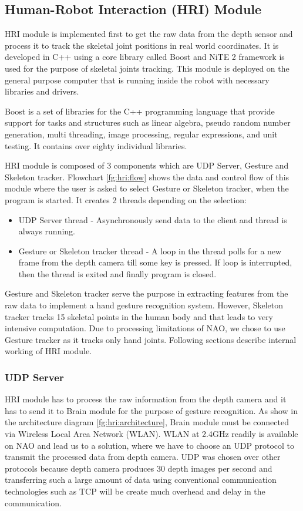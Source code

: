 \subsection{Human-Robot Interaction (HRI) Module} HRI module is implemented first to get the raw data from the depth sensor and process it to track the skeletal joint positions in real world coordinates. It is developed in C++ using a core library called Boost and NiTE 2 framework is used for the purpose of skeletal joints tracking. This module is deployed on the general purpose computer that is running inside the robot with necessary libraries and drivers.

Boost is a set of libraries for the C++ programming language that provide support for tasks and structures such as linear algebra, pseudo random number generation, multi threading, image processing, regular expressions, and unit testing. It contains over eighty individual libraries.

HRI module is composed of 3 components which are UDP Server, Gesture and Skeleton tracker. Flowchart \ref{fg:hri:flow} shows the data and control flow of this module where the user is asked to select Gesture or Skeleton tracker, when the program is started. It creates 2 threads depending on the selection: 
\begin{itemize}
	\item UDP Server thread - Asynchronously send data to the client and thread is always running. 
	\item Gesture or Skeleton tracker thread - A loop in the thread polls for a new frame from the depth camera till some key is pressed. If loop is interrupted, then the thread is exited and finally program is closed.
\end{itemize}

Gesture and Skeleton tracker serve the purpose in extracting features from the raw data to implement a hand gesture recognition system. However, Skeleton tracker tracks 15 skeletal points in the human body and that leads to very intensive computation. Due to processing limitations of NAO, we chose to use Gesture tracker as it tracks only hand joints. Following sections describe internal working of HRI module.



\subsubsection{UDP Server} HRI module has to process the raw information from the depth camera and it has to send it to Brain module for the purpose of gesture recognition. As show in the architecture diagram \ref{fg:hri:architecture}, Brain module must be connected via Wireless Local Area Network (WLAN). WLAN at 2.4GHz readily is available on NAO and lead us to a solution, where we have to choose an UDP protocol to transmit the processed data from depth camera. UDP was chosen over other protocols because depth camera produces 30 depth images per second and transferring such a large amount of data using conventional communication technologies such as TCP will be create much overhead and delay in the communication.

